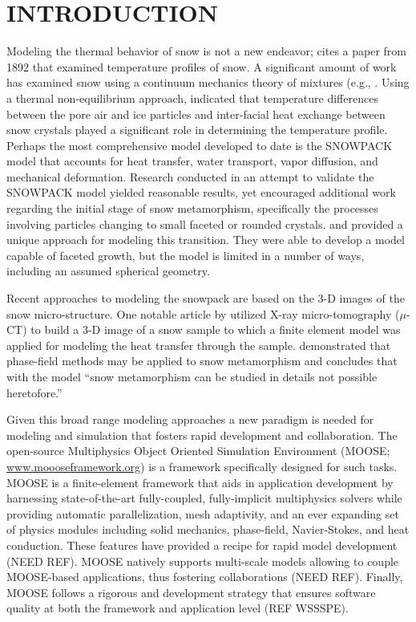 \section{INTRODUCTION}
Modeling the thermal behavior of snow is not a new endeavor; \citet{lachapelle1960} cites a paper from 1892 that examined temperature profiles of snow. A significant amount of work has examined snow using a continuum mechanics theory of mixtures (e.g., \citet{adams1989, brown1999}.  Using a thermal non-equilibrium approach, \citet{bartelt2004} indicated that temperature differences between the pore air and ice particles and inter-facial heat exchange between snow crystals played a significant role in determining the temperature profile. Perhaps the most comprehensive model developed to date is the SNOWPACK model \citep{lehning1999, bartelt2002, lehning2002a, lehning2002b} that accounts for heat transfer, water transport, vapor diffusion, and mechanical deformation.  Research conducted in an attempt to validate the SNOWPACK model yielded reasonable results, yet \citet{fierz2001} encouraged additional work regarding the initial stage of snow metamorphism, specifically the processes involving particles changing to small faceted or rounded crystals. \citet{miller2003} and \citet{miller2009} provided a unique approach for modeling this transition. They were able to develop a model capable of faceted growth, but the model is limited in a number of ways, including an assumed spherical geometry.

Recent approaches to modeling the snowpack are based on the 3-D images of the snow micro-structure.  One notable article by \citet{kaempfer2005} utilized X-ray micro-tomography ($\mu$-CT) to build a 3-D image of a snow sample to which a finite element model was applied for modeling the heat transfer through the sample. \citet{kaempfer2009phase} demonstrated that phase-field methods may be applied to snow metamorphism and concludes that with the model ``snow metamorphism can be studied in details not possible heretofore.''

Given this broad range modeling approaches a new paradigm is needed for modeling and simulation that fosters rapid development and collaboration. The open-source Multiphysics Object Oriented Simulation Environment (MOOSE; \url{www.moooseframework.org}) is a framework specifically designed for such tasks. MOOSE is a finite-element framework that aids in application development by harnessing state-of-the-art fully-coupled, fully-implicit multiphysics solvers while providing automatic parallelization, mesh adaptivity, and an ever expanding set of physics modules including solid mechanics, phase-field, Navier-Stokes, and heat conduction. These features have provided a recipe for rapid model development (NEED REF). MOOSE natively supports multi-scale models allowing to couple MOOSE-based applications, thus fostering collaborations (NEED REF). Finally, MOOSE follows a rigorous and development strategy that ensures software quality at both the framework and application level (REF WSSSPE).

